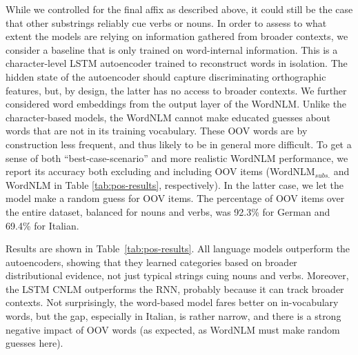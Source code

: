 While we controlled for the final affix as described above, it could
still be the case that other substrings reliably cue verbs or
nouns. In order to assess to what extent the models are relying on
information gathered from broader contexts, we consider a baseline
that is only trained on word-internal information. This is a
character-level LSTM autoencoder trained to reconstruct words in
isolation.  The hidden state of the autoencoder should capture
discriminating orthographic features, but, by design, the latter has
no access to broader contexts.  We further considered word embeddings
from the output layer of the WordNLM. Unlike the character-based
models, the WordNLM cannot make educated guesses about words that are
not in its training vocabulary. These OOV words are by construction
less frequent, and thus likely to be in general more difficult. To get
a sense of both ``best-case-scenario'' and more realistic WordNLM
performance, we report its accuracy both excluding and including OOV
items (WordNLM$_{\textit{subs.}}$ and WordNLM in Table
\ref{tab:pos-results}, respectively). In the latter case, we let the
model make a random guess for OOV items.  The percentage of OOV items
over the entire dataset, balanced for nouns and verbs, was 92.3\% for
German and 69.4\% for Italian.


Results are shown in Table~\ref{tab:pos-results}.  All language models
outperform the autoencoders, showing that they learned categories
based on broader distributional evidence, not just typical strings
cuing nouns and verbs. Moreover, the LSTM CNLM outperforms the RNN,
probably because it can track broader contexts. Not surprisingly, the
word-based model fares better on in-vocabulary words, but the gap,
especially in Italian, is rather narrow, and there is a strong
negative impact of OOV
words (as expected, as WordNLM must make random guesses here). %

